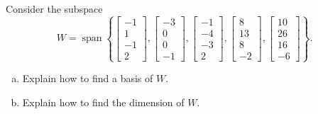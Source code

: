 
\begin{exerciseStatement}


Consider the subspace \[W=\operatorname{span}  \left\{ \left[\begin{array}{c}
-1 \\
1 \\
-1 \\
2
\end{array}\right] , \left[\begin{array}{c}
-3 \\
0 \\
0 \\
-1
\end{array}\right] , \left[\begin{array}{c}
-1 \\
-4 \\
-3 \\
2
\end{array}\right] , \left[\begin{array}{c}
8 \\
13 \\
8 \\
-2
\end{array}\right] , \left[\begin{array}{c}
10 \\
26 \\
16 \\
-6
\end{array}\right] \right\} .\]


\begin{enumerate}[(a)]
\item  Explain how to find a basis of \(W\).
\item  Explain how to find the dimension of \(W\).
\end{enumerate}
    
\end{exerciseStatement}
    
